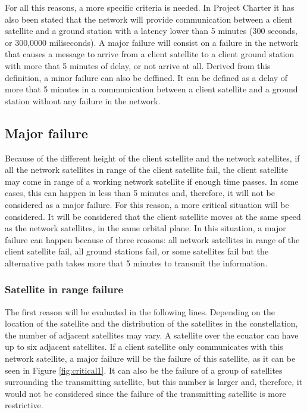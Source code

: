 For all this reasons, a more specific criteria is needed. In Project Charter it has also been stated that the network will provide communication between a client satellite and a ground station with a latency lower than 5 minutes (300 seconds, or 300,0000 miliseconds). A major failure will consist on a failure in the network that causes a message to arrive from a client satellite to a client ground station with more that 5 minutes of delay, or not arrive at all. Derived from this definition, a minor failure can also be deffined. It can be defined as a delay of more that 5 minutes in a communication between a client satellite and a ground station without any failure in the network.

\subsection{Major failure}
Because of the different height of the client satellite and the network satellites, if all the network satellites in range of the client satellite fail, the client satellite may come in range of a working network satellite if enough time passes. In some cases, this can happen in less than 5 minutes and, therefore, it will not be considered as a major failure. For this reason, a more critical situation will be considered. It will be considered that the client satellite moves at the same speed as the network satellites, in the same orbital plane. In this situation, a major failure can happen because of three reasons: all network satellites in range of the client satellite fail, all ground stations fail, or some satellites fail but the alternative path takes more that 5 minutes to transmit the information.

\subsubsection{Satellite in range failure}
The first reason will be evaluated in the following lines. Depending on the location of the satellite and the distribution of the satellites in the constellation, the number of adjacent satellites may vary. A satellite over the ecuator can have up to six adjacent satellites. If a client satellite only communicates with this network satellite, a major failure will be the failure of this satellite, as it can be seen in Figure \ref{fig:critical1}. It can also be the failure of a group of satellites surrounding the transmitting satellite, but this number is larger and, therefore, it would not be considered since the failure of the transmitting satellite is more restrictive.

